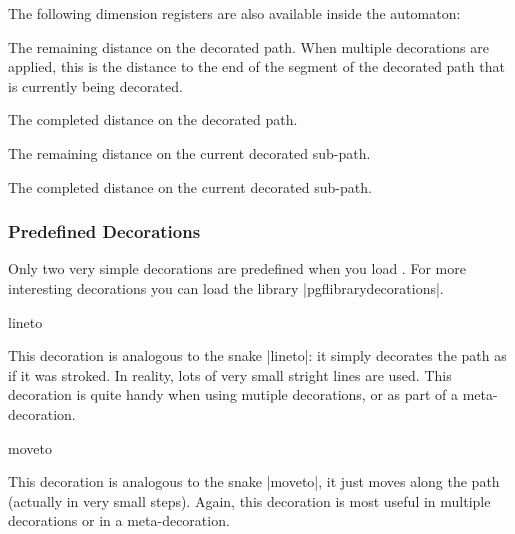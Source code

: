 \begin{command}{\pgfdeclaredecoration{}}
\begin{command}{\state{}}
		 The following dimension registers are also available inside the 
		 automaton:
		
		\begin{command}{\pgfdecoratedremainingdistance}
				The remaining distance on the decorated path. When multiple
				decorations are applied, this is the distance to the end
				of the segment of the decorated path that is currently being
				decorated.
		\end{command}
		
		\begin{command}{\pgfdecoratedcompleteddistance}
				The completed distance on the decorated path.
		\end{command}
		
		\begin{command}{\pgfdecoratedsubpathremainingdistance}
				The remaining distance on the current decorated sub-path.
		\end{command}
		
		\begin{command}{\pgfdecoratedsubpathcompleteddistance}
				The completed distance on the current decorated sub-path.
		\end{command}
	\end{command}
\end{command}


\subsubsection{Predefined Decorations}

Only two very simple decorations are predefined when you 
load \pgfname{}. For more interesting decorations you can load
the library |pgflibrarydecorations|.

\begin{decoration}{lineto}

	This decoration is analogous to the snake |lineto|: it simply 
	decorates the path as if it was stroked. In reality, lots
	of very small stright lines are used. This decoration is quite
	handy when using mutiple decorations, or as part of a
	meta-decoration.

\end{decoration}


\begin{decoration}{moveto}

 This decoration is analogous to the snake |moveto|, it just
 moves along the path (actually in very small steps). Again,
 this decoration is most useful in multiple decorations or in
 a meta-decoration.
 
\end{decoration}

